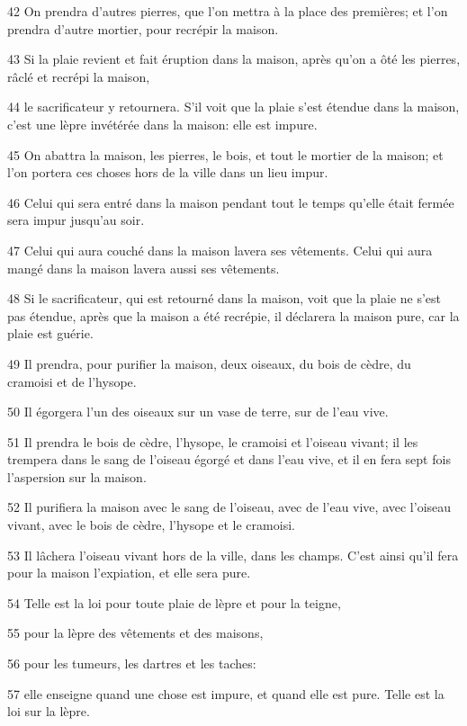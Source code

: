 \par 42 On prendra d'autres pierres, que l'on mettra à la place des premières; et l'on prendra d'autre mortier, pour recrépir la maison.
\par 43 Si la plaie revient et fait éruption dans la maison, après qu'on a ôté les pierres, râclé et recrépi la maison,
\par 44 le sacrificateur y retournera. S'il voit que la plaie s'est étendue dans la maison, c'est une lèpre invétérée dans la maison: elle est impure.
\par 45 On abattra la maison, les pierres, le bois, et tout le mortier de la maison; et l'on portera ces choses hors de la ville dans un lieu impur.
\par 46 Celui qui sera entré dans la maison pendant tout le temps qu'elle était fermée sera impur jusqu'au soir.
\par 47 Celui qui aura couché dans la maison lavera ses vêtements. Celui qui aura mangé dans la maison lavera aussi ses vêtements.
\par 48 Si le sacrificateur, qui est retourné dans la maison, voit que la plaie ne s'est pas étendue, après que la maison a été recrépie, il déclarera la maison pure, car la plaie est guérie.
\par 49 Il prendra, pour purifier la maison, deux oiseaux, du bois de cèdre, du cramoisi et de l'hysope.
\par 50 Il égorgera l'un des oiseaux sur un vase de terre, sur de l'eau vive.
\par 51 Il prendra le bois de cèdre, l'hysope, le cramoisi et l'oiseau vivant; il les trempera dans le sang de l'oiseau égorgé et dans l'eau vive, et il en fera sept fois l'aspersion sur la maison.
\par 52 Il purifiera la maison avec le sang de l'oiseau, avec de l'eau vive, avec l'oiseau vivant, avec le bois de cèdre, l'hysope et le cramoisi.
\par 53 Il lâchera l'oiseau vivant hors de la ville, dans les champs. C'est ainsi qu'il fera pour la maison l'expiation, et elle sera pure.
\par 54 Telle est la loi pour toute plaie de lèpre et pour la teigne,
\par 55 pour la lèpre des vêtements et des maisons,
\par 56 pour les tumeurs, les dartres et les taches:
\par 57 elle enseigne quand une chose est impure, et quand elle est pure. Telle est la loi sur la lèpre.

